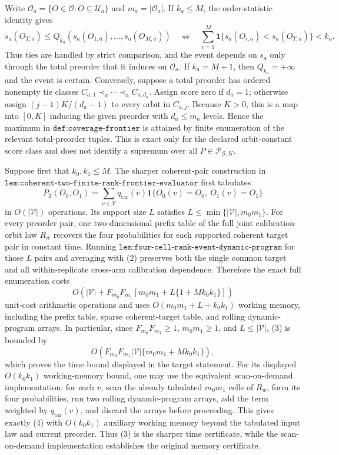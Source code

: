 Write \(\mathcal O_a=\{O\in\mathcal O:O\subseteq\mathcal U_a\}\) and \(m_a=|\mathcal O_a|\). If \(k_a\le M\), the order-statistic identity gives
\[
s_a(O_{T,a})\le Q_{k_a}(s_a(O_{1,a}),\ldots,s_a(O_{M,a}))
\quad\Longleftrightarrow\quad
\sum_{i=1}^M\mathbf 1\{s_a(O_{i,a})<s_a(O_{T,a})\}<k_a.
\tag{1}
\]
Thus ties are handled by strict comparison, and the event depends on \(s_a\) only through the total preorder that it induces on \(\mathcal O_a\). If \(k_a=M+1\), then \(Q_{k_a}=+\infty\) and the event is certain. Conversely, suppose a total preorder has ordered nonempty tie classes \(C_{a,1}\prec_a\cdots\prec_a C_{a,d_a}\). Assign score zero if \(d_a=1\); otherwise assign \((j-1)K/(d_a-1)\) to every orbit in \(C_{a,j}\). Because \(K>0\), this is a map into \([0,K]\) inducing the given preorder with \(d_a\le m_a\) levels. Hence the maximum in \(\texttt{def:coverage-frontier}\) is attained by finite enumeration of the relevant total-preorder tuples. This is exact only for the declared orbit-constant score class and does not identify a supremum over all \(P\in\mathcal P_{\mathcal G,K}\).

Suppose first that \(k_0,k_1\le M\). The sharper coherent-pair construction in \(\texttt{lem:coherent-two-finite-rank-frontier-evaluator}\) first tabulates
\[
P_T(O_0,O_1)=\sum_{v\in\mathcal V}q_{\mathrm{tar}}(v)\mathbf 1\{O_0(v)=O_0,\ O_1(v)=O_1\}
\tag{2}
\]
in \(O(|\mathcal V|)\) operations. Its support size \(L\) satisfies \(L\le\min\{|\mathcal V|,m_0m_1\}\). For every preorder pair, one two-dimensional prefix table of the full joint calibration-orbit law \(R_w\) recovers the four probabilities for each supported coherent target pair in constant time. Running \(\texttt{lem:four-cell-rank-event-dynamic-program}\) for those \(L\) pairs and averaging with (2) preserves both the single common target and all within-replicate cross-arm calibration dependence. Therefore the exact full enumeration costs
\[
O\!\left(|\mathcal V|+F_{m_0}F_{m_1}\left[m_0m_1+L\{1+Mk_0k_1\}\right]\right)
\tag{3}
\]
unit-cost arithmetic operations and uses \(O(m_0m_1+L+k_0k_1)\) working memory, including the prefix table, sparse coherent-target table, and rolling dynamic-program arrays. In particular, since \(F_{m_0}F_{m_1}\ge1\), \(m_0m_1\ge1\), and \(L\le|\mathcal V|\), (3) is bounded by
\[
O\!\left(F_{m_0}F_{m_1}|\mathcal V|\{m_0m_1+Mk_0k_1\}\right),
\tag{4}
\]
which proves the time bound displayed in the target statement. For its displayed \(O(k_0k_1)\) working-memory bound, one may use the equivalent scan-on-demand implementation: for each \(v\), scan the already tabulated \(m_0m_1\) cells of \(R_w\), form its four probabilities, run two rolling dynamic-program arrays, add the term weighted by \(q_{\mathrm{tar}}(v)\), and discard the arrays before proceeding. This gives exactly (4) with \(O(k_0k_1)\) auxiliary working memory beyond the tabulated input law and current preorder. Thus (3) is the sharper time certificate, while the scan-on-demand implementation establishes the original memory certificate.

